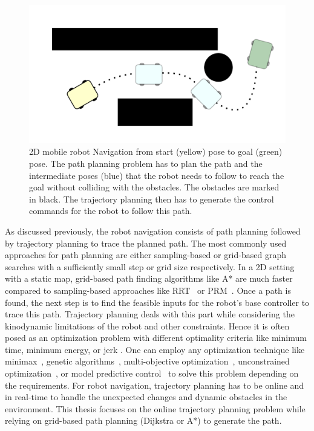 \begin{figure}[!h]
    \centering
    \includegraphics[width=0.9\columnwidth]{images/motion_planning_new.png}
    \caption{2D mobile robot Navigation from start (yellow) pose to goal (green) pose. The path planning problem has to plan the path and the intermediate poses (blue) that the robot needs to follow to reach the goal without colliding with the obstacles. The obstacles are marked in black. The trajectory planning then has to generate the control commands for the robot to follow this path.}
    \label{fig:navigation}
\end{figure}


As discussed previously, the robot navigation consists of path planning followed by trajectory planning to trace the planned path. The most commonly used approaches for path planning are either sampling-based \cite{lavalle2006sampling} or grid-based \cite{yap2002grid} graph searches with a sufficiently small step or grid size respectively. In a 2D setting with a static map, grid-based path finding algorithms like A* \cite{warren1993fast} are much faster compared to sampling-based approaches like RRT~\cite{kuffner2000rrt} or PRM~\cite{kavraki1996probabilistic}. Once a path is found, the next step is to find the feasible inputs for the robot's base controller to trace this path. Trajectory planning deals with this part while considering the kinodynamic limitations of the robot and other constraints. Hence it is often posed as an optimization problem with different optimality criteria like minimum time, minimum energy, or jerk \cite{gasparetto2015path}. One can employ any optimization technique like minimax~\cite{vathsal1977minimax}, genetic algorithms~\cite{tian2004effective}, multi-objective optimization~\cite{oleiwi2014multi}, unconstrained optimization~\cite{rosmann2013efficient}, or model predictive control~\cite{ardakani2015real} to solve this problem depending on the requirements. For robot navigation, trajectory planning has to be online and in real-time to handle the unexpected changes and dynamic obstacles in the environment. This thesis focuses on the online trajectory planning problem while relying on grid-based path planning (Dijkstra or A*) to generate the path.


